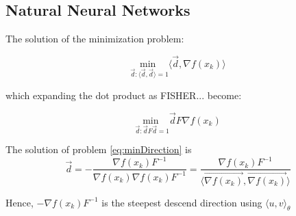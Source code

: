 \subsection{Natural Neural Networks}


The solution of the minimization problem:

\begin{equation}
 \underset{\vec{d}: \langle\vec{d},\vec{d}\rangle = 1} {\text{min  }} \langle \vec{d}, \nabla f(x_k)\rangle
 \label{eq:minDirection}
\end{equation}

which expanding the dot product as FISHER... become:

\begin{equation}
 \underset{\vec{d}: \vec{d}F\vec{d} = 1} {\text{min  }} \vec{d}F\nabla f(x_k)
\end{equation}

The solution of problem \ref{eq:minDirection} is 
\begin{equation}
\vec{d} = -\frac{\nabla f(x_k)F^{-1}}{\nabla f(x_k)\nabla f(x_k) F^{-1}} = \frac{\nabla f(x_k)F^{-1}}{\langle\vec{\nabla f(x_k)},\vec{\nabla f(x_k)}\rangle}
\end{equation}

Hence, $-\nabla f(x_k)F^{-1}$ is the steepest descend direction using $\langle u,v \rangle_{\theta}$

